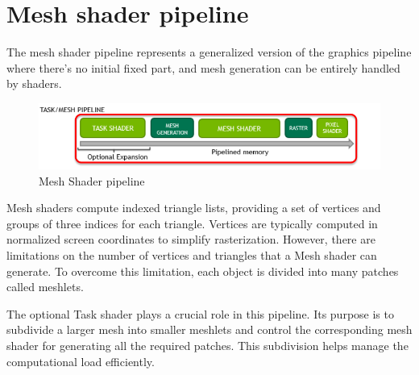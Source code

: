 \section{Mesh shader pipeline}

The mesh shader pipeline represents a generalized version of the graphics pipeline where there's no initial fixed part, and mesh generation can be entirely handled by shaders.
\begin{figure}[H]
    \centering
    \includegraphics[width=1\linewidth]{images/msp.png}
    \caption{Mesh Shader pipeline}
\end{figure}
Mesh shaders compute indexed triangle lists, providing a set of vertices and groups of three indices for each triangle. 
Vertices are typically computed in normalized screen coordinates to simplify rasterization. 
However, there are limitations on the number of vertices and triangles that a Mesh shader can generate. 
To overcome this limitation, each object is divided into many patches called meshlets.

The optional Task shader plays a crucial role in this pipeline. 
Its purpose is to subdivide a larger mesh into smaller meshlets and control the corresponding mesh shader for generating all the required patches. 
This subdivision helps manage the computational load efficiently.